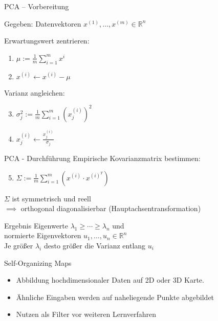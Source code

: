 \documentclass[xcolor={dvipsnames,svgnames},draft]{beamer}
\begin{document}
\begin{frame}{PCA -- Vorbereitung}

  Gegeben: Datenvektoren $x^{(1)},\ldots,x^{(m)} \in \mathbb{R}^n$
  \vspace{1em}

  Erwartungswert zentrieren:
  
  \begin{enumerate}
  \item $\mu := \frac{1}{m}\sum_{i=1}^m x^{i}$
  \item $x^{(i)} \leftarrow x^{(i)} - \mu$
  \end{enumerate}

  Varianz angleichen:

  \begin{enumerate}
  \setcounter{enumi}{2}
  \item $\sigma_j^2 := \frac{1}{m}\sum_{i=1}^m{(x_j^{(i)})}^2$
  \item $x_j^{(i)} \leftarrow \frac{x_j^{(i)}}{\sigma_j}$
  \end{enumerate}

\end{frame}

\begin{frame}{PCA - Durchführung}
  Empirische Kovarianzmatrix bestimmen:

  \begin{enumerate}
  \setcounter{enumi}{4}
  \item $\Sigma := \frac{1}{m}\sum_{i=1}^m (x^{(i)} \cdot x^{(i)^T})$
  \end{enumerate}

  $\Sigma$ ist symmetrisch und reell \\
  $\implies$ orthogonal diagonalisierbar
  (Hauptachsentransformation)

  \begin{block}{Ergebnis}
    Eigenwerte $\lambda_1 \geq \cdots \geq \lambda_n$ und \\
    normierte Eigenvektoren $u_1,\ldots,u_n \in \mathbb{R}^n$ \\
    Je größer $\lambda_i$ desto größer die Varianz entlang $u_i$
  \end{block}
\end{frame}

\begin{frame}{Self-Organizing Maps}

  \begin{itemize}
  \item Abbildung hochdimensionaler Daten auf 2D oder 3D Karte.
  \item Ähnliche Eingaben werden auf naheliegende Punkte abgebildet
  \item Nutzen als Filter vor weiteren Lernverfahren
  \end{itemize}
  
\end{frame}
\end{document}
